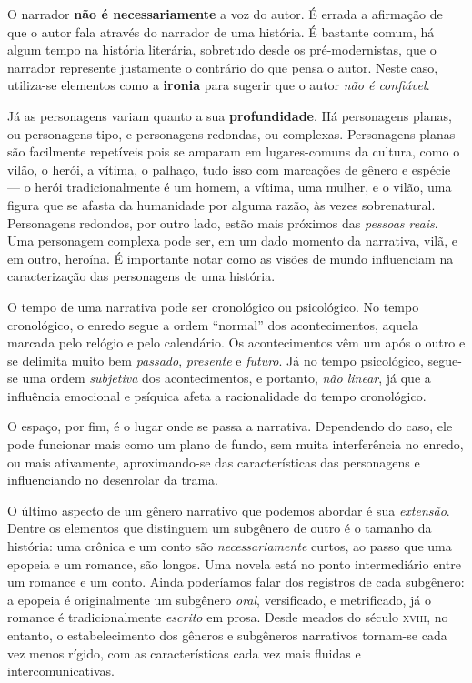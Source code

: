 \documentclass[11pt]{extarticle}
\begin{document}
O narrador \textbf{não é necessariamente} a voz do autor. É errada a afirmação de que o autor fala através do narrador de uma história. É bastante comum, há algum tempo na história literária, sobretudo desde os pré-modernistas, que o narrador represente justamente o contrário do que pensa o autor. Neste caso, utiliza-se elementos como a \textbf{ironia} para sugerir que o autor \textit{não é confiável}.

Já as personagens variam quanto a sua \textbf{profundidade}. Há personagens planas, ou personagens-tipo, e personagens redondas, ou complexas. Personagens planas são facilmente repetíveis pois se amparam em lugares-comuns da cultura, como o vilão, o herói, a vítima, o palhaço, tudo isso com marcações de gênero e espécie --- o herói tradicionalmente é um homem, a vítima, uma mulher, e o vilão, uma figura que se afasta da humanidade por alguma razão, às vezes sobrenatural. Personagens redondos, por outro lado, estão mais próximos das \textit{pessoas reais}. Uma personagem complexa pode ser, em um dado momento da narrativa, vilã, e em outro, heroína. É importante notar como as visões de mundo influenciam na caracterização das personagens de uma história.

O tempo de uma narrativa pode ser cronológico ou psicológico. No tempo cronológico, o enredo segue a ordem ``normal'' dos acontecimentos, aquela marcada pelo relógio e pelo calendário. Os acontecimentos vêm um após o outro e se delimita muito bem \textit{passado}, \textit{presente} e \textit{futuro}. Já no tempo psicológico, segue-se uma ordem \textit{subjetiva} dos acontecimentos, e portanto, \textit{não linear}, já que a influência emocional e psíquica afeta a racionalidade do tempo cronológico. 

O espaço, por fim, é o lugar onde se passa a narrativa. Dependendo do caso, ele pode funcionar mais como um plano de fundo, sem muita interferência no enredo, ou mais ativamente, aproximando-se das características das personagens e influenciando no desenrolar da trama. 


O último aspecto de um gênero narrativo que podemos abordar é sua \textit{extensão}. Dentre os elementos que distinguem um subgênero de outro é o tamanho da história: uma crônica e um conto são \textit{necessariamente} curtos, ao passo que uma epopeia e um romance, são longos. Uma novela está no ponto intermediário entre um romance e um conto. Ainda poderíamos falar dos registros de cada subgênero: a epopeia é originalmente um subgênero \textit{oral}, versificado, e metrificado, já o romance é tradicionalmente \textit{escrito} em prosa.  Desde meados do século \textsc{xviii}, no entanto, o estabelecimento dos gêneros e subgêneros narrativos tornam-se cada vez menos rígido, com as características cada vez mais fluidas e intercomunicativas.
\end{document}
